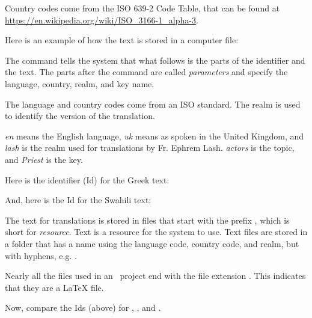 \documentclass[]{memoir}
\begin{document}
\begin{boxed}
Country codes come from the ISO 639-2 Code Table, that can be found at \url{https://en.wikipedia.org/wiki/ISO_3166-1_alpha-3}. 
\end{boxed}

Here is an example of how the text is stored in a computer file:

\begin{ltDocBlock}[]
\end{ltDocBlock}

The command tells the system that what follows is the parts of the identifier and the text.  The parts after the command are called \emph{parameters} and specify the language, country, realm, and key name.

The language and country codes come from an ISO standard.  The realm is used to identify the version of the translation.

\emph{en} means the English language, \emph{uk} means as spoken in the United Kingdom, and \emph{lash} is the realm used for translations by Fr. Ephrem Lash.  \emph{actors} is the topic, and \emph{Priest} is the key.

Here is the identifier (Id) for the Greek text:
\begin{ltDocBlock}[]
\end{ltDocBlock}

And, here is the Id for the Swahili text:

\begin{ltDocBlock}[]
\end{ltDocBlock}

\begin{boxed}
The text for translations is stored in files that start with the prefix , which is short for \emph{resource}.  Text is a resource for the system to use. Text files are stored in a folder that has a name using the language code, country code, and realm, but with hyphens, e.g. .
\end{boxed}
\begin{boxed}
Nearly all the files used in an \ltOcmcSystemAcronymn\ project end with the file extension .  This indicates that they are a \LaTeX{} file.
\end{boxed}
Now, compare the Ids (above) for , , and .
\end{document}
